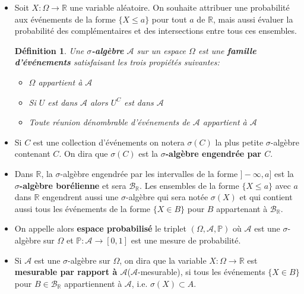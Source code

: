 \documentclass[10pt,a4paper,oneside]{article}
\newtheorem{definition}{Définition}
\begin{document}
\begin{itemize}
\item
Soit $X : \Omega \to \mathbb{R}$ une variable aléatoire. On souhaite attribuer une probabilité aux événements de la forme $\{ X \leq a \}$ pour tout $a$ de $\mathbb{R}$, mais aussi évaluer la probabilité des complémentaires et des intersections entre tous ces ensembles.

\begin{definition}
Une \textbf{$\sigma$-algèbre} $\mathcal{A}$ sur un espace $\Omega$ est une \textbf{famille d'événements} satisfaisant les trois propiétés suivantes:

\begin{itemize}
\item
$\Omega$ appartient à $\mathcal{A}$
\item
Si $U$ est dans $\mathcal{A}$ alors $U^C$ est dans $\mathcal{A}$
\item
Toute réunion dénombrable d'événements de $\mathcal{A}$ appartient à $\mathcal{A}$
\end{itemize}
\end{definition}

\item
Si $C$ est une collection d'événements on notera $\sigma(C)$ la plus petite $\sigma$-algèbre contenant $C$. On dira que $\sigma(C)$ est la \textbf{$\sigma$-algèbre engendrée par $C$}.

\item
Dans $\mathbb{R}$, la $\sigma$-algèbre engendrée par les intervalles de la forme $]-\infty,a]$ est la \textbf{$\sigma$-algèbre borélienne} et sera $\mathcal{B}_\mathbb{R}$. Les ensembles de la forme $\{ X \leq a \}$ avec $a$ dans $\mathbb{R}$ engendrent aussi une $\sigma$-algèbre qui sera notée $\sigma(X)$ et qui contient aussi tous les événements de la forme $\{ X \in B \}$ pour $B$ appartenant à $\mathcal{B}_\mathbb{R}$.

\item
On appelle alors \textbf{espace probabilisé} le triplet $(\Omega, \mathcal{A}, \mathbb{P})$ où $\mathcal{A}$ est une $\sigma$-algèbre sur $\Omega$ et $\mathbb{P} : \mathcal{A} \to [0,1]$ est une mesure de probabilité.

\item
Si $\mathcal{A}$ est une $\sigma$-algèbre sur $\Omega$, on dira que la variable $X : \Omega \to \mathbb{R}$ est \textbf{mesurable par rapport à $\mathcal{A}$}($\mathcal{A}$-mesurable), si tous les événements $\{ X \in B \}$ pour $B \in \mathcal{B}_\mathbb{R}$ appartiennent à $\mathcal{A}$, i.e. $\sigma(X) \subset A$.


\end{itemize}
\end{document}
